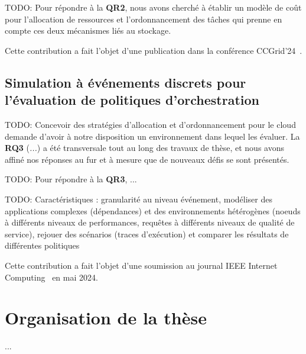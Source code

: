 TODO: Pour répondre à la \textbf{QR2}, nous avons cherché à établir un modèle de coût pour l'allocation de ressources et l'ordonnancement des tâches qui prenne en compte ces deux mécanismes liés au stockage.

Cette contribution a fait l'objet d'une publication dans la conférence CCGrid'24~\cite{herocache}.

\subsection{Simulation à événements discrets pour l'évaluation de politiques d'orchestration}

TODO: Concevoir des stratégies d'allocation et d'ordonnancement pour le cloud demande d'avoir à notre disposition un environnement dans lequel les évaluer. La \textbf{RQ3} (\textit{...}) a été transversale tout au long des travaux de thèse, et nous avons affiné nos réponses au fur et à mesure que de nouveaux défis se sont présentés.

TODO: Pour répondre à la \textbf{QR3}, ...

TODO: Caractéristiques : granularité au niveau événement, modéliser des applications complexes (dépendances) et des environnements hétérogènes (noeuds à différents niveaux de performances, requêtes à différents niveaux de qualité de service), rejouer des scénarios (traces d'exécution) et comparer les résultats de différentes politiques

Cette contribution a fait l'objet d'une soumission au journal IEEE Internet Computing~\cite{herosim} en mai 2024.

\section{Organisation de la thèse}

...
